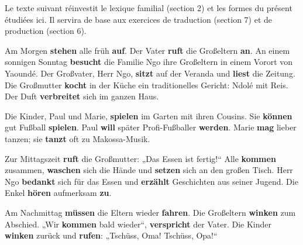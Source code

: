 \documentclass[11pt]{article}
\begin{document}
Le texte suivant réinvestit le lexique familial (section 2) et les formes du présent étudiées ici. Il servira de base aux exercices de traduction (section 7) et de production (section 6).

\begin{textebox}
Am Morgen \textbf{stehen} alle früh \textbf{auf}. Der Vater \textbf{ruft} die Großeltern \textbf{an}. An einem sonnigen Sonntag \textbf{besucht} die Familie Ngo ihre Großeltern in einem Vorort von Yaoundé. Der Großvater, Herr Ngo, \textbf{sitzt} auf der Veranda und \textbf{liest} die Zeitung. Die Großmutter \textbf{kocht} in der Küche ein traditionelles Gericht: Ndolé mit Reis. Der Duft \textbf{verbreitet} sich im ganzen Haus.

Die Kinder, Paul und Marie, \textbf{spielen} im Garten mit ihren Cousins. Sie \textbf{können} gut Fußball \textbf{spielen}. Paul \textbf{will} später Profi-Fußballer \textbf{werden}. Marie \textbf{mag} lieber tanzen; sie \textbf{tanzt} oft zu Makossa-Musik.

Zur Mittagszeit \textbf{ruft} die Großmutter: „Das Essen ist fertig!“ Alle \textbf{kommen} zusammen, \textbf{waschen} sich die Hände und \textbf{setzen} sich an den großen Tisch. Herr Ngo \textbf{bedankt} sich für das Essen und \textbf{erzählt} Geschichten aus seiner Jugend. Die Enkel \textbf{hören} aufmerksam \textbf{zu}.

Am Nachmittag \textbf{müssen} die Eltern wieder \textbf{fahren}. Die Großeltern \textbf{winken} zum Abschied. „Wir \textbf{kommen} bald wieder“, \textbf{verspricht} der Vater. Die Kinder \textbf{winken} zurück und \textbf{rufen}: „Tschüss, Oma! Tschüss, Opa!“
\end{textebox}
\end{document}
